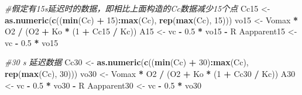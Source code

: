 \documentclass[
]{krantz}
\makeatletter
\newenvironment{Shaded}{\begin{snugshade}}{\end{snugshade}}
\newcommand{\CommentTok}[1]{\textcolor[rgb]{0.56,0.35,0.01}{\textit{#1}}}
\newcommand{\DecValTok}[1]{\textcolor[rgb]{0.00,0.00,0.81}{#1}}
\newcommand{\FloatTok}[1]{\textcolor[rgb]{0.00,0.00,0.81}{#1}}
\newcommand{\KeywordTok}[1]{\textcolor[rgb]{0.13,0.29,0.53}{\textbf{#1}}}
\newcommand{\NormalTok}[1]{#1}
\newcommand{\OperatorTok}[1]{\textcolor[rgb]{0.81,0.36,0.00}{\textbf{#1}}}
\newcommand{\StringTok}[1]{\textcolor[rgb]{0.31,0.60,0.02}{#1}}
\newenvironment{kframe}{%
\medskip{}
\setlength{\fboxsep}{.8em}
 \def\at@end@of@kframe{}%
 \ifinner\ifhmode%
  \def\at@end@of@kframe{\end{minipage}}%
  \begin{minipage}{\columnwidth}%
 \fi\fi%
 \def\FrameCommand##1{\hskip\@totalleftmargin \hskip-\fboxsep
 \colorbox{shadecolor}{##1}\hskip-\fboxsep
     \hskip-\linewidth \hskip-\@totalleftmargin \hskip\columnwidth}%
 \MakeFramed {\advance\hsize-\width
   \@totalleftmargin\z@ \linewidth\hsize
   \@setminipage}}%
 {\par\unskip\endMakeFramed%
 \at@end@of@kframe}
\renewenvironment{Shaded}{\begin{kframe}}{\end{kframe}}
\makeatother
\begin{document}
\begin{Shaded}
\begin{Highlighting}[]
\CommentTok{\#假定有15s延迟时的数据，即相比上面构造的Cc数据减少15个点}
\NormalTok{Cc15 \textless{}{-}}\StringTok{ }\KeywordTok{as.numeric}\NormalTok{(}\KeywordTok{c}\NormalTok{((}\KeywordTok{min}\NormalTok{(Cc) }\OperatorTok{+}\StringTok{ }\DecValTok{15}\NormalTok{)}\OperatorTok{:}\KeywordTok{max}\NormalTok{(Cc), }\KeywordTok{rep}\NormalTok{(}\KeywordTok{max}\NormalTok{(Cc), }\DecValTok{15}\NormalTok{)))}
\NormalTok{vo15 \textless{}{-}}\StringTok{ }\NormalTok{Vomax }\OperatorTok{*}\StringTok{ }\NormalTok{O2 }\OperatorTok{/}\StringTok{ }\NormalTok{(O2 }\OperatorTok{+}\StringTok{ }\NormalTok{Ko }\OperatorTok{*}\StringTok{ }\NormalTok{(}\DecValTok{1} \OperatorTok{+}\StringTok{ }\NormalTok{Cc15 }\OperatorTok{/}\StringTok{ }\NormalTok{Kc))}
\NormalTok{A15 \textless{}{-}}\StringTok{ }\NormalTok{vc }\OperatorTok{{-}}\StringTok{ }\FloatTok{0.5} \OperatorTok{*}\StringTok{ }\NormalTok{vo15 }\OperatorTok{{-}}\StringTok{ }\NormalTok{R}
\NormalTok{Aapparent15 \textless{}{-}}\StringTok{ }\NormalTok{vc }\OperatorTok{{-}}\StringTok{ }\FloatTok{0.5} \OperatorTok{*}\StringTok{ }\NormalTok{vo15}

\CommentTok{\#30 s 延迟数据}
\NormalTok{Cc30 \textless{}{-}}\StringTok{ }\KeywordTok{as.numeric}\NormalTok{(}\KeywordTok{c}\NormalTok{((}\KeywordTok{min}\NormalTok{(Cc) }\OperatorTok{+}\StringTok{ }\DecValTok{30}\NormalTok{)}\OperatorTok{:}\KeywordTok{max}\NormalTok{(Cc), }\KeywordTok{rep}\NormalTok{(}\KeywordTok{max}\NormalTok{(Cc), }\DecValTok{30}\NormalTok{)))}
\NormalTok{vo30 \textless{}{-}}\StringTok{ }\NormalTok{Vomax }\OperatorTok{*}\StringTok{ }\NormalTok{O2 }\OperatorTok{/}\StringTok{ }\NormalTok{(O2 }\OperatorTok{+}\StringTok{ }\NormalTok{Ko }\OperatorTok{*}\StringTok{ }\NormalTok{(}\DecValTok{1} \OperatorTok{+}\StringTok{ }\NormalTok{Cc30 }\OperatorTok{/}\StringTok{ }\NormalTok{Kc))}
\NormalTok{A30 \textless{}{-}}\StringTok{ }\NormalTok{vc }\OperatorTok{{-}}\StringTok{ }\FloatTok{0.5} \OperatorTok{*}\StringTok{ }\NormalTok{vo30 }\OperatorTok{{-}}\StringTok{ }\NormalTok{R}
\NormalTok{Aapparent30 \textless{}{-}}\StringTok{ }\NormalTok{vc }\OperatorTok{{-}}\StringTok{ }\FloatTok{0.5} \OperatorTok{*}\StringTok{ }\NormalTok{vo30}


\end{Highlighting}
\end{Shaded}
\end{document}

